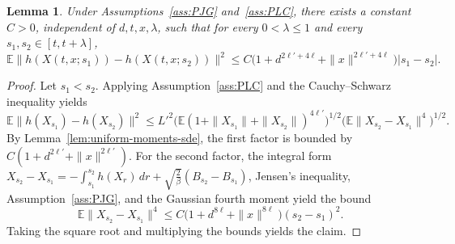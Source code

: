 \documentclass[11pt,a4paper,reqno]{amsart}
\theoremstyle{plain}
\newtheorem{lemma}{Lemma}
\theoremstyle{definition}
\theoremstyle{remark}
\newcommand{\E}{\mathbb{E}}
\begin{document}
\begin{lemma}
\label{lem:time-reg-h-of-X}
Under Assumptions~\ref{ass:PJG} and~\ref{ass:PLC}, there exists a constant $C>0$, independent of $d,t,x,\lambda$, such that for every $0<\lambda\le1$ and every $s_1,s_2\in[t,t+\lambda]$,
\[
  \E\|h(X(t,x;s_1))-h(X(t,x;s_2))\|^2
  \le
  C\bigl(1+d^{2\ell'+4\ell}+\|x\|^{2\ell'+4\ell}\bigr)|s_1-s_2|.
\]
\end{lemma}

\begin{proof}
Let $s_1<s_2$. Applying Assumption~\ref{ass:PLC} and the Cauchy--Schwarz inequality yields
\[
  \E\|h(X_{s_1})-h(X_{s_2})\|^2
  \le
  L'^2\bigl(\E(1+\|X_{s_1}\|+\|X_{s_2}\|)^{4\ell'}\bigr)^{1/2}
  \bigl(\E\|X_{s_2}-X_{s_1}\|^{4}\bigr)^{1/2}.
\]
By Lemma~\ref{lem:uniform-moments-sde}, the first factor is bounded by $C(1+d^{2\ell'}+\|x\|^{2\ell'})$. For the second factor, the integral form $X_{s_2}-X_{s_1}=-\int_{s_1}^{s_2}h(X_r)\,dr+\sqrt{\frac{2}{\beta}}(B_{s_2}-B_{s_1})$, Jensen's inequality, Assumption~\ref{ass:PJG}, and the Gaussian fourth moment yield the bound
\[
  \E\|X_{s_2}-X_{s_1}\|^4
  \le
  C\bigl(1+d^{8\ell}+\|x\|^{8\ell}\bigr)(s_2-s_1)^2.
\]
Taking the square root and multiplying the bounds yields the claim.
\end{proof}
\end{document}
